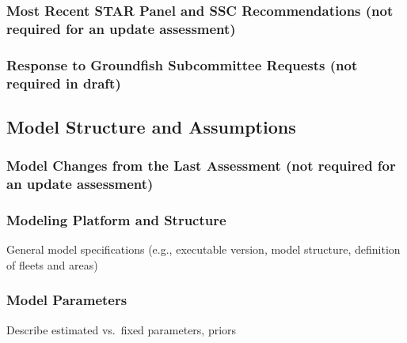 \documentclass[11pt,
  english,
  letterpaper,
]{article}
\begin{document}
\hypertarget{most-recent-star-panel-and-ssc-recommendations-not-required-for-an-update-assessment}{%
\subsubsection{Most Recent STAR Panel and SSC Recommendations (not required for an update assessment)}\label{most-recent-star-panel-and-ssc-recommendations-not-required-for-an-update-assessment}}

\hypertarget{response-to-groundfish-subcommittee-requests-not-required-in-draft}{%
\subsubsection{Response to Groundfish Subcommittee Requests (not required in draft)}\label{response-to-groundfish-subcommittee-requests-not-required-in-draft}}

\hypertarget{model-structure-and-assumptions}{%
\subsection{Model Structure and Assumptions}\label{model-structure-and-assumptions}}

\hypertarget{model-changes-from-the-last-assessment-not-required-for-an-update-assessment}{%
\subsubsection{Model Changes from the Last Assessment (not required for an update assessment)}\label{model-changes-from-the-last-assessment-not-required-for-an-update-assessment}}

\hypertarget{modeling-platform-and-structure}{%
\subsubsection{Modeling Platform and Structure}\label{modeling-platform-and-structure}}

General model specifications (e.g., executable version, model structure, definition of fleets and areas)

\hypertarget{model-parameters}{%
\subsubsection{Model Parameters}\label{model-parameters}}

Describe estimated vs.~fixed parameters, priors
\end{document}
